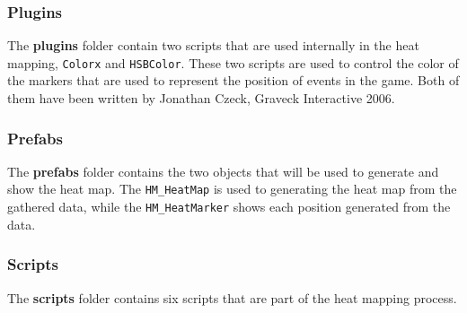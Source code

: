 \subsubsection*{Plugins}
\label{03_01_02}

The \textbf{plugins} folder contain two scripts that are used internally in the heat mapping, \texttt{Colorx} and \texttt{HSBColor}. These two scripts are used to control the color of the markers that are used to represent the position of events in the game. Both of them have been written by Jonathan Czeck, Graveck Interactive 2006.

\subsubsection*{Prefabs}
\label{03_01_03}

The \textbf{prefabs} folder contains the two objects that will be used to generate and show the heat map. The \texttt{HM\_HeatMap} is used to generating the heat map from the gathered data, while the \texttt{HM\_HeatMarker} shows each position generated from the data.

\subsubsection*{Scripts}
\label{03_01_04}

The \textbf{scripts} folder contains six scripts that are part of the heat mapping process.

